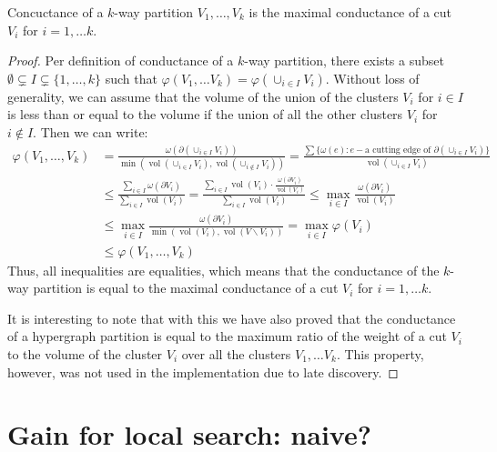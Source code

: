\documentclass[acmsmall,nonacm,screen,review]{acmart}
\DeclareMathOperator{\vol}{vol}
\begin{document}
\begin{theorem}
  Concuctance of a $k$-way partition $V_1, \dots, V_k$ is the maximal conductance 
  of a cut $V_i$ for $i = 1, \dots k$. 
\end{theorem}
\begin{proof}
Per definition of conductance of a $k$-way partition, there exists a subset 
$\emptyset \subsetneq I \subsetneq \{1, \dots, k\}$ such that 
$\varphi(V_1, \dots V_k) = \varphi(\cup_{i \in I} V_i)$. Without loss of
generality, we can assume that the volume of the union of the clusters
$V_i$ for $i \in I$ is less than or equal to the volume if the union of all the
other clusters $V_i$ for $i \notin I$. Then we can write:
\begin{align*}
\varphi(V_1, \dots, V_k) 
&= 
\frac{\omega(\partial (\cup_{i \in I} V_i))}
     {\min(\vol(\cup_{i \in I} V_i), \vol(\cup_{i \notin I} V_i))} 
=
\frac{\sum \{\omega(e) : e - \text{a cutting edge of } \partial(\cup_{i \in I} V_i)\}}
     {\vol(\cup_{i \in I} V_i)}
\\ & \leq
\frac{\sum_{i \in I} \omega(\partial V_i)}
     {\sum_{i \in I} \vol(V_i)} 
=
\frac{\sum_{i \in I} \vol(V_i) \cdot \frac{\omega(\partial V_i)}
                                          {\vol(V_i)}}
     {\sum_{i \in I} \vol(V_i)} 
\leq
\max_{i \in I}\frac{\omega(\partial V_i)}
                   {\vol(V_i)}
\\ &\leq
\max_{i \in I}\frac{\omega(\partial V_i)}
                   {\min(\vol(V_i), \vol(V \backslash V_i))}
=
\max_{i \in I} \varphi(V_i)
\\ &\leq 
\varphi(V_1, \dots, V_k)
\end{align*}
Thus, all inequalities are equalities, which means that the conductance of the
$k$-way partition is equal to the maximal conductance of a cut $V_i$ for
$i = 1, \dots k$.

It is interesting to note that with this we have also proved that the 
conductance of a hypergraph partition is equal to the maximum ratio of the 
weight of a cut $V_i$ to the volume of the cluster $V_i$ over all the clusters 
$V_1, \dots V_k$. This property, however, was not used in the implementation 
due to late discovery.
\end{proof}


\section{Gain for local search: naive?}
\end{document}
